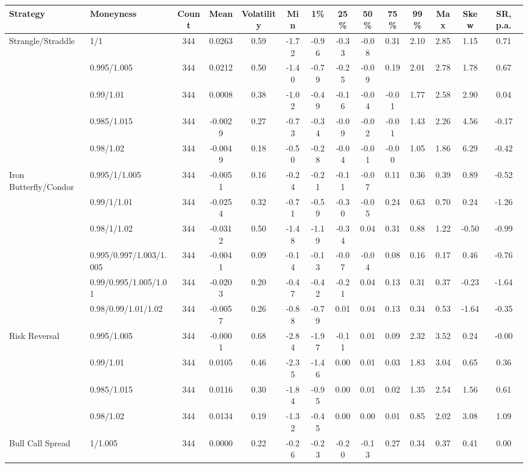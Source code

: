 \begin{tabular}{llcccccccccccc}
\toprule
Strategy & Moneyness & Count & Mean & Volatility & Min & 1\% & 25\% & 50\% & 75\% & 99\% & Max & Skew & SR, p.a. \\
\midrule
Strangle/Straddle & 1/1 & 344 & 0.0263 & 0.59 & -1.72 & -0.96 & -0.33 & -0.08 & 0.31 & 2.10 & 2.85 & 1.15 & 0.71 \\
 & 0.995/1.005 & 344 & 0.0212 & 0.50 & -1.40 & -0.79 & -0.25 & -0.09 & 0.19 & 2.01 & 2.78 & 1.78 & 0.67 \\
 & 0.99/1.01 & 344 & 0.0008 & 0.38 & -1.02 & -0.49 & -0.16 & -0.04 & -0.01 & 1.77 & 2.58 & 2.90 & 0.04 \\
 & 0.985/1.015 & 344 & -0.0029 & 0.27 & -0.73 & -0.34 & -0.09 & -0.02 & -0.01 & 1.43 & 2.26 & 4.56 & -0.17 \\
 & 0.98/1.02 & 344 & -0.0049 & 0.18 & -0.50 & -0.28 & -0.04 & -0.01 & -0.00 & 1.05 & 1.86 & 6.29 & -0.42 \\
Iron Butterfly/Condor & 0.995/1/1.005 & 344 & -0.0051 & 0.16 & -0.24 & -0.21 & -0.11 & -0.07 & 0.11 & 0.36 & 0.39 & 0.89 & -0.52 \\
 & 0.99/1/1.01 & 344 & -0.0254 & 0.32 & -0.71 & -0.59 & -0.30 & -0.05 & 0.24 & 0.63 & 0.70 & 0.24 & -1.26 \\
 & 0.98/1/1.02 & 344 & -0.0312 & 0.50 & -1.48 & -1.19 & -0.34 & 0.04 & 0.31 & 0.88 & 1.22 & -0.50 & -0.99 \\
 & 0.995/0.997/1.003/1.005 & 344 & -0.0041 & 0.09 & -0.14 & -0.13 & -0.07 & -0.04 & 0.08 & 0.16 & 0.17 & 0.46 & -0.76 \\
 & 0.99/0.995/1.005/1.01 & 344 & -0.0203 & 0.20 & -0.47 & -0.42 & -0.21 & 0.04 & 0.13 & 0.31 & 0.37 & -0.23 & -1.64 \\
 & 0.98/0.99/1.01/1.02 & 344 & -0.0057 & 0.26 & -0.88 & -0.79 & 0.01 & 0.04 & 0.13 & 0.34 & 0.53 & -1.64 & -0.35 \\
Risk Reversal & 0.995/1.005 & 344 & -0.0001 & 0.68 & -2.84 & -1.97 & -0.11 & 0.01 & 0.09 & 2.32 & 3.52 & 0.24 & -0.00 \\
 & 0.99/1.01 & 344 & 0.0105 & 0.46 & -2.35 & -1.46 & 0.00 & 0.01 & 0.03 & 1.83 & 3.04 & 0.65 & 0.36 \\
 & 0.985/1.015 & 344 & 0.0116 & 0.30 & -1.84 & -0.95 & 0.00 & 0.01 & 0.02 & 1.35 & 2.54 & 1.56 & 0.61 \\
 & 0.98/1.02 & 344 & 0.0134 & 0.19 & -1.32 & -0.45 & 0.00 & 0.00 & 0.01 & 0.85 & 2.02 & 3.08 & 1.09 \\
Bull Call Spread & 1/1.005 & 344 & 0.0000 & 0.22 & -0.26 & -0.23 & -0.20 & -0.13 & 0.27 & 0.34 & 0.37 & 0.41 & 0.00 \\

\end{tabular}
